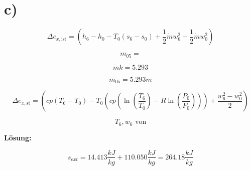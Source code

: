 

\section*{c)}

\[
\Delta e_{x, \text{ist}} = (h_6 - h_0 - T_0 (s_6 - s_0) + \frac{1}{2} \dot{m} w_6^2 - \frac{1}{2} \dot{m} w_0^2)
\]

\[
m_{05} = 
\]

\[
\dot{m} k = 5.293
\]

\[
\dot{m}_{05} = 5.293 \dot{m}
\]

\[
\Delta e_{x, \text{st}} = (cp (T_6 - T_0) - T_0 \left( cp \left( \ln \left( \frac{T_6}{T_0} \right) - R \ln \left( \frac{P_0}{P_0} \right) \right) \right) + \frac{w_6^2 - w_0^2}{2})
\]

\[
T_6, w_6 \text{ von}
\]

\textbf{Lösung:}

\[
s_{ext} = 14.413 \frac{kJ}{kg} + 110.050 \frac{kJ}{kg} = 264.18 \frac{kJ}{kg}
\]